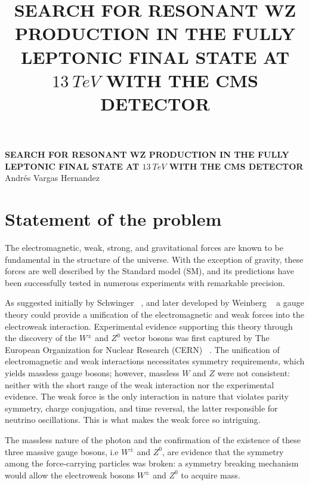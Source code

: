 \documentclass[10pt]{article}
\author{}
\title{SEARCH FOR RESONANT WZ PRODUCTION IN THE FULLY LEPTONIC FINAL STATE AT $13~TeV$ WITH THE CMS DETECTOR}
\begin{document}
\begin{center}
  {\Large \textbf{SEARCH FOR RESONANT WZ PRODUCTION IN THE FULLY LEPTONIC FINAL STATE AT $13~TeV$ WITH THE CMS DETECTOR}}\\
  \vspace{1em}
         {\large Andr\'es Vargas Hernandez}\\
         \vspace{1em}
\end{center}

\vspace{5mm}


\section{Statement of the problem}

The electromagnetic, weak, strong, and gravitational forces are known to be fundamental in the structure of the universe. With the exception of gravity, these forces are well described by the Standard model (SM), and its predictions have been successfully tested in numerous experiments with remarkable precision.

As suggested initially by Schwinger ~\cite{schwinger1957}, and later developed by Weinberg ~\cite{weinberg1967} a gauge theory could provide a unification of the electromagnetic and weak forces into the electroweak interaction. Experimental evidence supporting this theory through the discovery of the $W^{\pm}$ and $Z^{0}$ vector bosons was first captured by The European Organization for Nuclear Research (CERN) ~\cite{cern1974,arnison1983,banner1983}. The unification of electromagnetic and weak interactions necessitates symmetry requirements, which yields massless gauge bosons; however, massless $W$ and $Z$ were not consistent: neither with the short range of the weak interaction nor the experimental evidence. The weak force is the only interaction in nature that violates parity symmetry, charge conjugation, and time reversal, the latter responsible for neutrino oscillations. This is what makes the weak force so intriguing.

The massless nature of the photon and the confirmation of the existence of these three massive gauge bosons, i.e $W^{\pm}$ and $Z^{0}$, are evidence that the symmetry among the force-carrying particles was broken: a symmetry breaking mechanism would allow the electroweak bosons $W^{\pm}$ and $Z^{0}$ to acquire mass.
\end{document}
